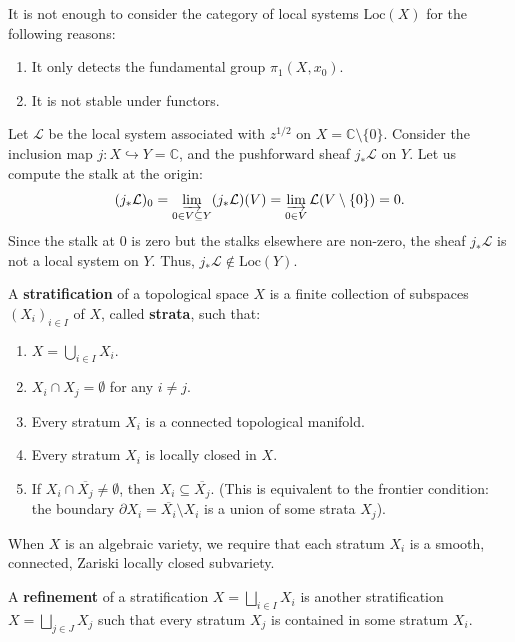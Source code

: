 It is not enough to consider the category of local systems $\mathrm{Loc}(X)$ for the following reasons:
\begin{enumerate}
    \item It only detects the fundamental group $\pi_1(X, x_0)$.
    \item It is not stable under functors.
\end{enumerate}

\begin{example}
    Let $\mathcal{L}$ be the local system associated with $z^{1/2}$ on $X = \mathbb{C} \setminus \{0\}$. Consider the inclusion map $j: X \hookrightarrow Y = \mathbb{C}$, and the pushforward sheaf $j_* \mathcal{L}$ on $Y$. Let us compute the stalk at the origin:
\[ (j_* \mathcal{L})_0 = \varinjlim_{0 \in V \subseteq Y} (j_* \mathcal{L})(V) = \varinjlim_{0 \in V} \mathcal{L}(V \setminus \{0\}) = 0. \]
Since the stalk at $0$ is zero but the stalks elsewhere are non-zero, the sheaf $j_* \mathcal{L}$ is not a local system on $Y$. Thus, $j_* \mathcal{L} \notin \mathrm{Loc}(Y)$.
\end{example}

\begin{definition}
A \textbf{stratification} of a topological space $X$ is a finite collection of subspaces $(X_i)_{i \in I}$ of $X$, called \textbf{strata}, such that:
\begin{enumerate}
    \item $X = \bigcup_{i \in I} X_i$.
    \item $X_i \cap X_j = \emptyset$ for any $i \neq j$.
    \item Every stratum $X_i$ is a connected topological manifold.
    \item Every stratum $X_i$ is locally closed in $X$.
    \item If $X_i \cap \overline{X_j} \neq \emptyset$, then $X_i \subseteq \overline{X_j}$. (This is equivalent to the frontier condition: the boundary $\partial X_i = \overline{X_i} \setminus X_i$ is a union of some strata $X_j$).
\end{enumerate}
\end{definition}

\begin{remark}
    When $X$ is an algebraic variety, we require that each stratum $X_i$ is a smooth, connected, Zariski locally closed subvariety.
\end{remark}

\begin{definition}
A \textbf{refinement} of a stratification $X = \bigsqcup_{i \in I} X_i$ is another stratification $X = \bigsqcup_{j \in J} X_j$ such that every stratum $X_j$ is contained in some stratum $X_i$.
\end{definition}

